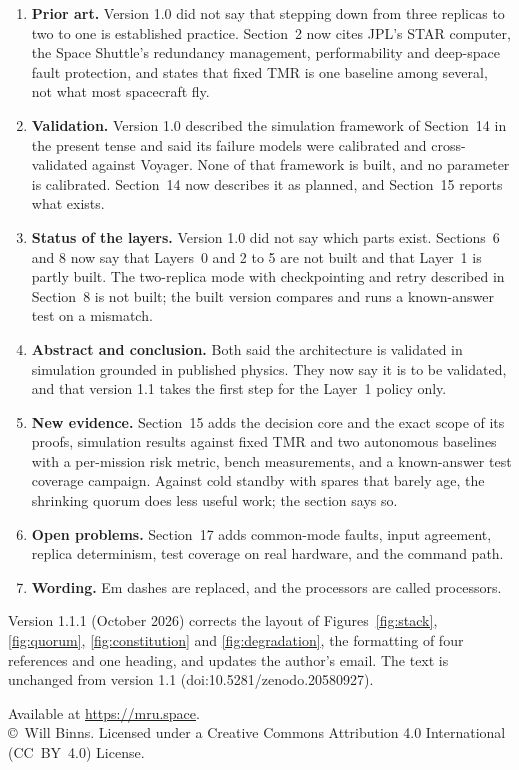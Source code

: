 \documentclass[10pt, a4paper]{article}
\begin{document}
\begin{enumerate}
\item \textbf{Prior art.} Version 1.0 did not say that stepping down from three replicas to two to one is established practice. Section~2 now cites JPL's STAR computer, the Space Shuttle's redundancy management, performability and deep-space fault protection, and states that fixed TMR is one baseline among several, not what most spacecraft fly.
\item \textbf{Validation.} Version 1.0 described the simulation framework of Section~14 in the present tense and said its failure models were calibrated and cross-validated against Voyager. None of that framework is built, and no parameter is calibrated. Section~14 now describes it as planned, and Section~15 reports what exists.
\item \textbf{Status of the layers.} Version 1.0 did not say which parts exist. Sections~6 and 8 now say that Layers~0 and 2 to 5 are not built and that Layer~1 is partly built. The two-replica mode with checkpointing and retry described in Section~8 is not built; the built version compares and runs a known-answer test on a mismatch.
\item \textbf{Abstract and conclusion.} Both said the architecture is validated in simulation grounded in published physics. They now say it is to be validated, and that version 1.1 takes the first step for the Layer~1 policy only.
\item \textbf{New evidence.} Section~15 adds the decision core and the exact scope of its proofs, simulation results against fixed TMR and two autonomous baselines with a per-mission risk metric, bench measurements, and a known-answer test coverage campaign. Against cold standby with spares that barely age, the shrinking quorum does less useful work; the section says so.
\item \textbf{Open problems.} Section~17 adds common-mode faults, input agreement, replica determinism, test coverage on real hardware, and the command path.
\item \textbf{Wording.} Em dashes are replaced, and the processors are called processors.
\end{enumerate}

Version 1.1.1 (October 2026) corrects the layout of Figures~\ref{fig:stack}, \ref{fig:quorum}, \ref{fig:constitution} and \ref{fig:degradation}, the formatting of four references and one heading, and updates the author's email. The text is unchanged from version 1.1 (doi:10.5281/zenodo.20580927).




\vspace{1.5em}
\begin{center}
\footnotesize
Available at \url{https://mru.space}. \\
\copyright~Will Binns. Licensed under a Creative Commons Attribution 4.0 International (CC~BY~4.0) License.
\end{center}
\end{document}
